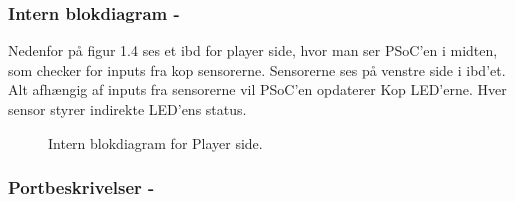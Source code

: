 \documentclass[Arkitektur/System_main.tex]{subfiles}
\begin{document}
\subsubsection{Intern blokdiagram - }

Nedenfor på figur 1.4 ses et ibd for player side, hvor man ser PSoC'en i midten, som checker for inputs fra kop sensorerne. Sensorerne ses på venstre side i ibd'et. Alt afhængig af inputs fra sensorerne vil PSoC'en opdaterer Kop LED'erne. Hver sensor styrer indirekte LED'ens status.

\begin{figure}[H]
    \centering
    \caption{Intern blokdiagram for Player side.}
    \label{fig:playerside_hardware_ibd}
\end{figure}

\subsubsection{Portbeskrivelser - }
\end{document}
